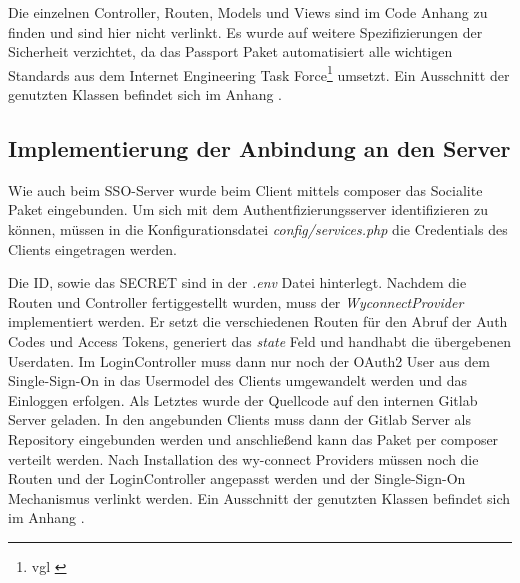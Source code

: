 Die einzelnen Controller, Routen, Models und Views sind im Code Anhang zu finden und sind hier nicht verlinkt. Es wurde auf weitere Spezifizierungen der Sicherheit verzichtet, da das Passport Paket automatisiert alle wichtigen Standards aus dem Internet Engineering Task Force\footnote{vgl \cite{OAuth2}} umsetzt. Ein Ausschnitt der genutzten Klassen befindet sich im Anhang .

\subsection{Implementierung der Anbindung an den Server}
\label{sec:ImplementierungCient}

Wie auch beim SSO-Server wurde beim Client mittels composer das Socialite Paket eingebunden. Um sich mit dem Authentfizierungsserver identifizieren zu können, müssen in die Konfigurationsdatei \textit{config/services.php} die Credentials des Clients eingetragen werden. 

Die ID, sowie das SECRET sind in der \textit{.env} Datei hinterlegt. Nachdem die Routen und Controller fertiggestellt wurden, muss der \textit{WyconnectProvider} implementiert werden. Er setzt die verschiedenen Routen für den Abruf der Auth Codes und Access Tokens, generiert das \textit{state} Feld und handhabt die übergebenen Userdaten. 
Im LoginController muss dann nur noch der OAuth2 User aus dem Single-Sign-On in das Usermodel des Clients umgewandelt werden und das Einloggen erfolgen. 
Als Letztes wurde der Quellcode auf den internen Gitlab Server geladen. In den angebunden Clients muss dann der Gitlab Server als Repository eingebunden werden und anschließend kann das Paket per composer verteilt werden. 
Nach Installation des wy-connect Providers müssen noch die Routen und der LoginController angepasst werden und der Single-Sign-On Mechanismus verlinkt werden. Ein Ausschnitt der genutzten Klassen befindet sich im Anhang .

